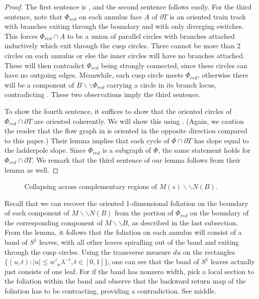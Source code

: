 \documentclass[12pt]{amsart}
\theoremstyle{definition}
\numberwithin{equation}{section}
\begin{document}
\begin{proof}
The first sentence is , and the second sentence follows easily. For the third sentence, note that $\Phi_{red}$ on each annulus face $A$ of $\partial T$ is an oriented train track with branches exiting through the boundary and with only diverging switches. This forces $\Phi_{red} \cap A$ to be a union of parallel circles with branches attached inductively which exit through the cusp circles. There cannot be more than 2 circles on each annulus or else the inner circles will have no branches attached. These will then contradict $\Phi_{red}$ being strongly connected, since these circles can have no outgoing edges. Meanwhile, each cusp circle meets $\Phi_{red}$, otherwise there will be a component of $B \backslash \backslash \Phi_{red}$ carrying a circle in its branch locus, contradicting . These two observations imply the third sentence.

To show the fourth sentence, it suffices to show that the oriented circles of $\Phi_{red} \cap \partial T$ are oriented coherently. We will show this using \cite[Lemma 5.4]{LMT20}. (Again, we caution the reader that the flow graph in \cite{LMT20} is oriented in the opposite direction compared to this paper.) Their lemma implies that each cycle of $\Phi \cap \partial T$ has slope equal to the ladderpole slope. Since $\Phi_{red}$ is a subgraph of $\Phi$, the same statement holds for $\Phi_{red} \cap \partial T$. We remark that the third sentence of our lemma follows from their lemma as well.
\end{proof}

\begin{figure}
    \centering
    \resizebox{!}{6cm}{}
    \caption{Collapsing across complementary regions of $M(s) \backslash \backslash N(B)$.}
    \label{fig:unstableglue}
\end{figure}

Recall that we can recover the oriented 1-dimensional foliation on the boundary of each component of $M \backslash \backslash N(B)$ from the portion of $\Phi_{red}$ on the boundary of the corresponding component of $M \backslash \backslash B$, as described in the last subsection. From the lemma, it follows that the foliation on each annulus will consist of a band of $S^1$ leaves, with all other leaves spiralling out of the band and exiting through the cusp circles. Using the transverse measure $du$ on the rectangles $\{ (u,t): |u| \leq w'_w \lambda^{-t}, t \in [0,1] \}$, one can see that the band of $S^1$ leaves actually just consists of one leaf. For if the band has nonzero width, pick a local section to the foliation within the band and observe that the backward return map of the foliation has to be contracting, providing a contradiction. See  middle.
\end{document}
